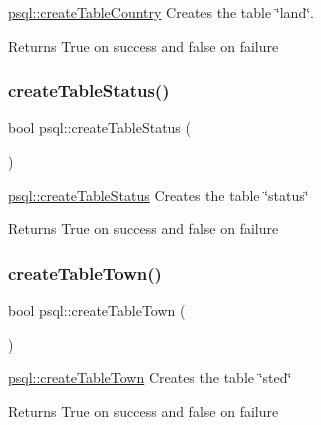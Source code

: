 \hyperlink{classpsql_ab6e496d8471f3cd9c5c082a6ba75c25b}{psql\+::create\+Table\+Country} Creates the table \char`\"{}land\char`\"{}. 

\begin{DoxyReturn}{Returns}
True on success and false on failure 
\end{DoxyReturn}
\mbox{\label{classpsql_a427ad0f483c8ab7a4d23912278bc69e8}} 
\subsubsection{\texorpdfstring{create\+Table\+Status()}{createTableStatus()}}
{\footnotesize\ttfamily bool psql\+::create\+Table\+Status (\begin{DoxyParamCaption}{ }\end{DoxyParamCaption})}



\hyperlink{classpsql_a427ad0f483c8ab7a4d23912278bc69e8}{psql\+::create\+Table\+Status} Creates the table \char`\"{}status\char`\"{} 

\begin{DoxyReturn}{Returns}
True on success and false on failure 
\end{DoxyReturn}
\mbox{\label{classpsql_a95d1f522766174bd2c6a7b94f725719c}} 
\subsubsection{\texorpdfstring{create\+Table\+Town()}{createTableTown()}}
{\footnotesize\ttfamily bool psql\+::create\+Table\+Town (\begin{DoxyParamCaption}{ }\end{DoxyParamCaption})}



\hyperlink{classpsql_a95d1f522766174bd2c6a7b94f725719c}{psql\+::create\+Table\+Town} Creates the table \char`\"{}sted\char`\"{} 

\begin{DoxyReturn}{Returns}
True on success and false on failure 
\end{DoxyReturn}
\mbox{\label{classpsql_ad6fb8e1e7177c7996f297d477ecceb27}} 
